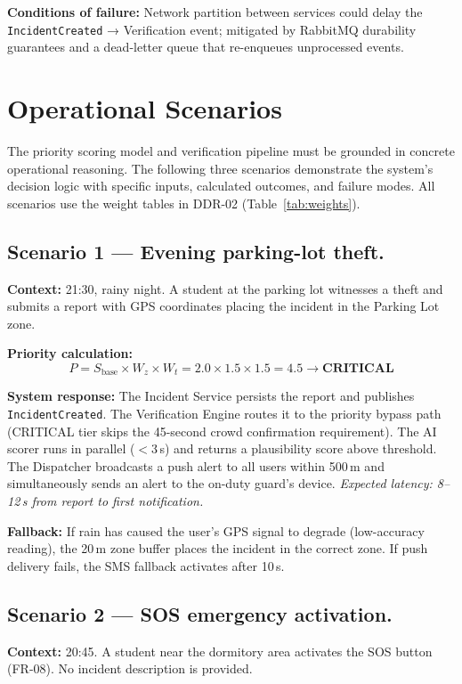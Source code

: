\documentclass[12pt,a4paper]{article}
\begin{document}
\textbf{Conditions of failure:}
Network partition between services could delay the
\texttt{IncidentCreated} → Verification event; mitigated by RabbitMQ
durability guarantees and a dead-letter queue that re-enqueues
unprocessed events.

\section{Operational Scenarios}
\label{sec:scenarios}

The priority scoring model and verification pipeline must be
grounded in concrete operational reasoning. The following three
scenarios demonstrate the system's decision logic with specific inputs,
calculated outcomes, and failure modes. All scenarios use the weight
tables in DDR-02 (Table~\ref{tab:weights}).

\subsection{Scenario 1 --- Evening parking-lot theft.}
\textbf{Context:} 21:30, rainy night. A student at the parking lot
witnesses a theft and submits a report with GPS coordinates placing
the incident in the Parking Lot zone.

\textbf{Priority calculation:}
\[
P = S_{\text{base}} \times W_z \times W_t = 2.0 \times 1.5 \times 1.5 = \mathbf{4.5 \rightarrow \text{CRITICAL}}
\]

\textbf{System response:}
The Incident Service persists the report and publishes
\texttt{IncidentCreated}. The Verification Engine routes it to the
priority bypass path (CRITICAL tier skips the 45-second crowd
confirmation requirement). The AI scorer runs in parallel ($<$3\,s)
and returns a plausibility score above threshold. The Dispatcher
broadcasts a push alert to all users within 500\,m and
simultaneously sends an alert to the on-duty guard's device.
\emph{Expected latency: 8--12\,s from report to first notification.}

\textbf{Fallback:} If rain has caused the user's GPS signal to degrade
(low-accuracy reading), the 20\,m zone buffer places the incident in
the correct zone. If push delivery fails, the SMS fallback activates
after 10\,s.

\subsection{Scenario 2 --- SOS emergency activation.}
\textbf{Context:} 20:45. A student near the dormitory area activates
the SOS button (FR-08). No incident description is provided.
\end{document}
